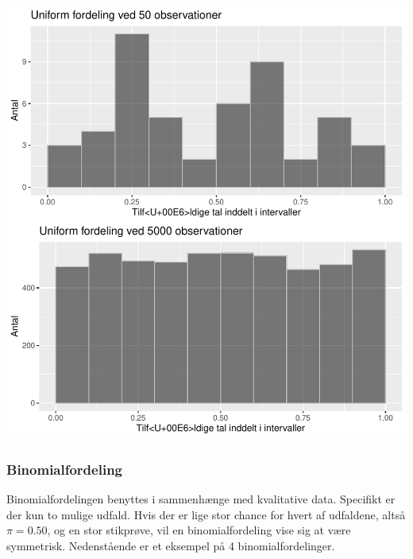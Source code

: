 \documentclass[
]{article}
\begin{document}
\includegraphics{TP2_files/figure-latex/unnamed-chunk-11-1.pdf}

\hypertarget{binomialfordeling}{%
\subsubsection{Binomialfordeling}\label{binomialfordeling}}

Binomialfordelingen benyttes i sammenhænge med kvalitative data.
Specifikt er der kun to mulige udfald. Hvis der er lige stor chance for
hvert af udfaldene, altså \(\pi = 0.50\), og en stor stikprøve, vil en
binomialfordeling vise sig at være symmetrisk. Nedenstående er et
eksempel på 4 binomialfordelinger.
\end{document}
